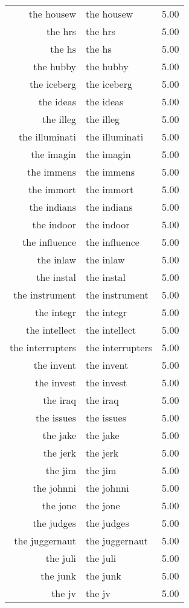 \begin{table}[ht]
\begin{tabular}{rlr}
  the housew & the housew & 5.00 \\ 
  the hrs & the hrs & 5.00 \\ 
  the hs & the hs & 5.00 \\ 
  the hubby & the hubby & 5.00 \\ 
  the iceberg & the iceberg & 5.00 \\ 
  the ideas & the ideas & 5.00 \\ 
  the illeg & the illeg & 5.00 \\ 
  the illuminati & the illuminati & 5.00 \\ 
  the imagin & the imagin & 5.00 \\ 
  the immens & the immens & 5.00 \\ 
  the immort & the immort & 5.00 \\ 
  the indians & the indians & 5.00 \\ 
  the indoor & the indoor & 5.00 \\ 
  the influence & the influence & 5.00 \\ 
  the inlaw & the inlaw & 5.00 \\ 
  the instal & the instal & 5.00 \\ 
  the instrument & the instrument & 5.00 \\ 
  the integr & the integr & 5.00 \\ 
  the intellect & the intellect & 5.00 \\ 
  the interrupters & the interrupters & 5.00 \\ 
  the invent & the invent & 5.00 \\ 
  the invest & the invest & 5.00 \\ 
  the iraq & the iraq & 5.00 \\ 
  the issues & the issues & 5.00 \\ 
  the jake & the jake & 5.00 \\ 
  the jerk & the jerk & 5.00 \\ 
  the jim & the jim & 5.00 \\ 
  the johnni & the johnni & 5.00 \\ 
  the jone & the jone & 5.00 \\ 
  the judges & the judges & 5.00 \\ 
  the juggernaut & the juggernaut & 5.00 \\ 
  the juli & the juli & 5.00 \\ 
  the junk & the junk & 5.00 \\ 
  the jv & the jv & 5.00 \\ 

\end{tabular}
\end{table}
